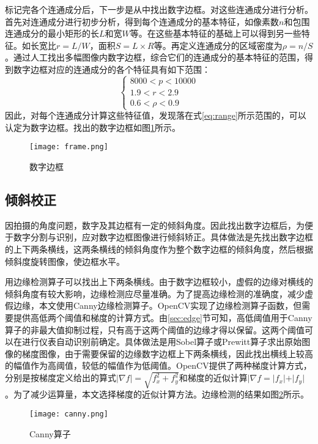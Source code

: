 标记完各个连通成分后，下一步是从中找出数字边框。对这些连通成分进行分析。首先对连通成分进行初步分析，得到每个连通成分的基本特征，如像素数$n$和包围连通成分的最小矩形的长$L$和宽$W$等。在这些基本特征的基础上可以得到另一些特征。如长宽比$r=L/W$，面积$S=L\times R$等。再定义连通成分的区域密度为$\rho=n/S$。通过人工找出多幅图像内数字边框，综合它们的连通成分的基本特征的范围，得到数字边框对应的连通成分的各个特征具有如下范围：
\begin{equation}
  \label{eq:range}
  \begin{cases}
    8000  <  p  <  10000 \\
1.9  <  r  <  2.9 \\
0.6  <  \rho  < 0.9 
  \end{cases}
\end{equation}
因此，对每个连通成分计算这些特征值，发现落在式\eqref{eq:range}所示范围的，可以认定为数字边框。找出的数字边框如图\ref{eq:frame}所示。
\begin{figure}[h]
  \centering
  \texttt{[image: frame.png]}
  \caption{数字边框}
  \label{eq:frame}
\end{figure}

\subsection{倾斜校正}

因拍摄的角度问题，数字及其边框有一定的倾斜角度。因此找出数字边框后，为便于数字分割与识别，应对数字边框图像进行倾斜矫正。具体做法是先找出数字边框的上下两条横线，这两条横线的倾斜角度作为整个数字边框的倾斜角度，然后根据倾斜度旋转图像，使边框水平。

用边缘检测算子可以找出上下两条横线。由于数字边框较小，虚假的边缘对横线的倾斜角度有较大影响，边缘检测应尽量准确。为了提高边缘检测的准确度，减少虚假边缘，本文使用Canny边缘检测算子。OpenCV实现了边缘检测算子函数，但需要提供高低两个阈值和梯度的计算方式。由\ref{sec:edge}节可知，高低阈值用于Canny算子的非最大值抑制过程，只有高于这两个阈值的边缘才得以保留。这两个阈值可以在进行仪表自动识别前确定。具体做法是用Sobel算子或Prewitt算子求出原始图像的梯度图像，由于需要保留的边缘数字边框上下两条横线，因此找出横线上较高的幅值作为高阈值，较低的幅值作为低阈值。OpenCV提供了两种梯度计算方式，分别是按梯度定义给出的算式$|\nabla f|=\sqrt{f_x^2+f_y^2}$和梯度的近似计算$|\nabla f=|f_x|+|f_y|$。为了减少运算量，本文选择梯度的近似计算方法。边缘检测的结果如图\ref{fig:canny}所示。
\begin{figure}[h]
  \centering
  \texttt{[image: canny.png]}
  \caption{Canny算子}
  \label{fig:canny}
\end{figure}

